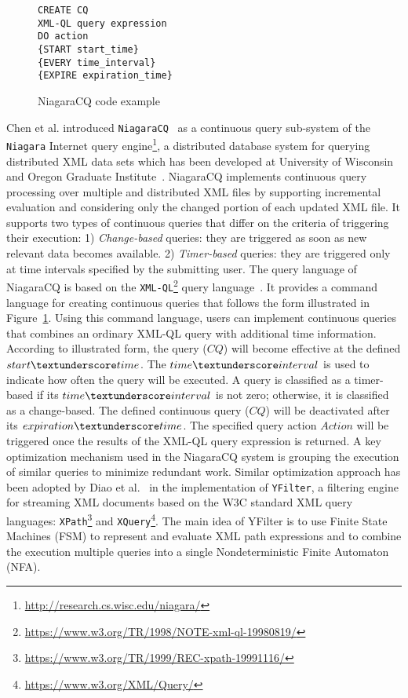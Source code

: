 \begin{figure}
\begin{lstlisting}
CREATE CQ
XML-QL query expression
DO action
{START start_time} 
{EVERY time_interval} 
{EXPIRE expiration_time}
\end{lstlisting}
\caption{\label{fig:Niagra}NiagaraCQ code example}
\end{figure}

Chen et al. introduced  \texttt{NiagaraCQ}~\cite{chen_et_al_2000} as a continuous query sub-system of the \texttt{Niagara}
Internet query engine\footnote{\url{http://research.cs.wisc.edu/niagara/}},  a distributed database system for querying distributed XML data sets which has been developed at University of Wisconsin and Oregon Graduate Institute~\cite{naughton2001niagara}. NiagaraCQ implements continuous query processing over multiple and distributed XML files by supporting incremental evaluation and considering only the changed portion of each updated XML file. It supports two types of continuous queries that differ on the criteria of triggering their execution:
1) \emph{Change-based}  queries: they are triggered as soon as new relevant data becomes available. 2) \emph{Timer-based}  queries: they are triggered only at time intervals specified by the submitting user. The query language of NiagaraCQ is based on the \texttt{XML-QL}\footnote{\url{https://www.w3.org/TR/1998/NOTE-xml-ql-19980819/}} query language~\cite{deutsch1999query}.
It provides a command language for creating continuous queries that follows the  form illustrated in Figure~\ref{fig:Niagra}. Using this command language, users can implement continuous queries that combines an ordinary XML-QL query with additional time information.
According to illustrated form, the query ($CQ$) will become effective at the defined $start\textunderscore time$. The
$time\textunderscore interval$ is used to indicate how often the query will be executed. A
query is classified as a timer-based if its $time\textunderscore interval$ is not zero; otherwise, it
is classified as a change-based. 
The defined continuous query ($CQ$) will be deactivated after its $expiration\textunderscore time$. The specified query action $Action$ will be triggered once the results of the XML-QL query expression is returned.  A key optimization mechanism used  in the NiagaraCQ system is grouping the execution of similar queries to minimize redundant work.  Similar optimization approach has been adopted by Diao et al.~\cite{diao_et_al_2002} in the implementation of  \texttt{YFilter}, a filtering engine for streaming XML documents based on the W3C standard XML query languages: \texttt{XPath}\footnote{\url{https://www.w3.org/TR/1999/REC-xpath-19991116/}} and \texttt{XQuery}\footnote{\url{https://www.w3.org/XML/Query/}}. The main idea of YFilter is to use Finite State Machines (FSM)  to represent and evaluate XML path expressions and to combine the execution multiple queries into a single Nondeterministic Finite Automaton (NFA). 
